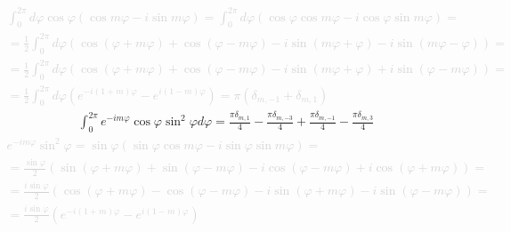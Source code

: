 \textcolor{lightgray}{ \begin{equation*} \begin{aligned}
\int_{0}^{2\pi} d \varphi \cos \varphi 
\left( \cos m \varphi - i \sin m \varphi \right) = \int_{0}^{2\pi} d \varphi
\left( \cos \varphi \cos m \varphi - i \cos \varphi \sin m \varphi \right) = \\
= \frac{1}{2} \int_{0}^{2\pi} d \varphi \left( 
\cos (\varphi + m \varphi) + \cos (\varphi - m \varphi) - 
i \sin (m \varphi + \varphi) - i \sin (m \varphi - \varphi) \right) = \\
= \frac{1}{2} \int_{0}^{2\pi} d \varphi \left( 
\cos (\varphi + m \varphi) + \cos (\varphi - m \varphi) - 
i \sin (m \varphi + \varphi) + i \sin (\varphi - m \varphi) \right) = \\
= \frac{1}{2} \int_{0}^{2\pi} d \varphi 
\left( e^{-i (1 + m) \varphi} - e^{i (1 - m) \varphi} \right) = 
\pi \left( \delta_{m,-1} + \delta_{m,1} \right)
\end{aligned} \end{equation*} }
%
\begin{equation} \begin{aligned}
\int_{0}^{2\pi} e^{-i m \varphi} \cos \varphi \sin^2 \varphi d \varphi = 
\frac{\pi \delta_{m,1} }{4}  - \frac{\pi \delta_{m,-3} }{4} + 
\frac{\pi \delta_{m,-1} }{4}  - \frac{\pi \delta_{m,3} }{4}
\end{aligned} \end{equation}
%
\textcolor{lightgray}{ \begin{equation*} \begin{aligned}
e^{-i m \varphi} \sin^2 \varphi = \sin \varphi \left( 
\sin \varphi \cos m \varphi - i \sin \varphi \sin m \varphi \right) = \\
= \frac{\sin \varphi}{2} \left( \sin (\varphi + m \varphi) + 
\sin (\varphi - m \varphi) - i \cos (\varphi - m \varphi) + 
i \cos (\varphi + m \varphi) \right) = \\ 
= \frac{i \sin \varphi}{2} \left( \cos (\varphi + m \varphi) - 
\cos (\varphi - m \varphi) - i \sin (\varphi + m \varphi) - 
i \sin (\varphi - m \varphi) \right) = \\
= \frac{i \sin \varphi}{2} \left( e^{-i(1+m)\varphi} - e^{i(1-m)\varphi} \right)
\end{aligned} \end{equation*} }
%
